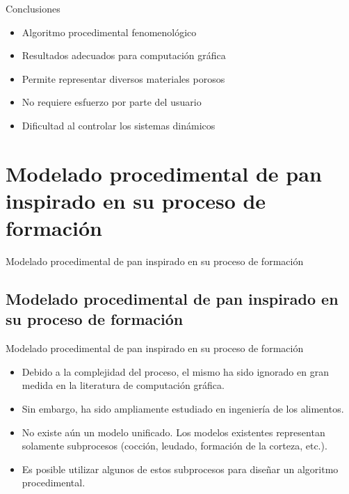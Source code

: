 \documentclass[spanish]{beamer}
\begin{document}
\begin{frame}{Conclusiones}
\begin{block}{}
\begin{itemize}
\item Algoritmo procedimental fenomenológico
\item Resultados adecuados para computación gráfica
\item Permite representar diversos materiales porosos
\item No requiere esfuerzo por parte del usuario

\item Dificultad al controlar los sistemas dinámicos
\end{itemize}
\end{block}
\end{frame}


\section[Modelado de Pan]{Modelado procedimental de pan inspirado en su proceso de formación}


\begin{frame}
\begin{block}{}
\begin{center}
\vspace{1cm}
\huge{Modelado procedimental de pan inspirado en su proceso de formación}
\vspace{1cm}
\end{center}
\end{block}
\end{frame}

\subsection{Modelado procedimental de pan inspirado en su proceso de formación}
\begin{frame}{Modelado procedimental de pan inspirado en su proceso de formación}
\begin{block}{}
\begin{itemize}
\item Debido a la complejidad del proceso, el mismo ha sido ignorado en gran medida en la literatura de computación gráfica.

\item Sin embargo, ha sido ampliamente estudiado en ingeniería de los alimentos.

\item No existe aún un modelo unificado. Los modelos existentes representan solamente subprocesos (cocción, leudado, formación de la corteza, etc.).

\item Es posible utilizar algunos de estos subprocesos para diseñar un algoritmo procedimental.
\end{itemize}
\end{block}
\end{frame}
\end{document}
